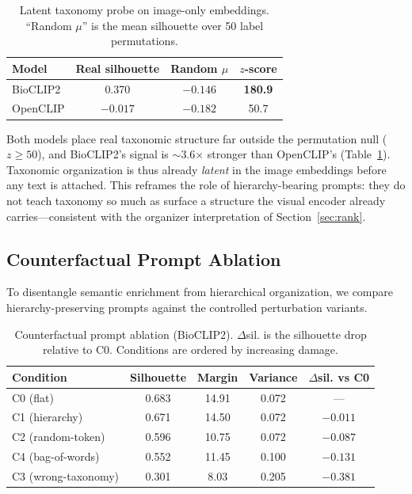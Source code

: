\begin{table}[t]
\centering
\caption{Latent taxonomy probe on image-only embeddings. ``Random $\mu$'' is the
mean silhouette over 50 label permutations.}
\label{tab:latent}
\begin{tabular}{lccc}
\hline
Model & Real silhouette & Random $\mu$ & $z$-score \\
\hline
BioCLIP2 & 0.370 & $-0.146$ & \textbf{180.9} \\
OpenCLIP & $-0.017$ & $-0.182$ & 50.7 \\
\hline
\end{tabular}
\end{table}

Both models place real taxonomic structure far outside the permutation null
($z \ge 50$), and BioCLIP2's signal is $\sim$3.6$\times$ stronger than OpenCLIP's
(Table~\ref{tab:latent}). Taxonomic organization is thus already \emph{latent} in
the image embeddings before any text is attached. This reframes the role of
hierarchy-bearing prompts: they do not teach taxonomy so much as surface a structure
the visual encoder already carries---consistent with the organizer interpretation of
Section~\ref{sec:rank}.

\subsection{Counterfactual Prompt Ablation}
\label{sec:ablation}

To disentangle semantic enrichment from hierarchical organization, we compare
hierarchy-preserving prompts against the controlled perturbation variants.

\begin{table}[t]
\centering
\caption{Counterfactual prompt ablation (BioCLIP2). $\Delta$sil. is the silhouette
drop relative to C0. Conditions are ordered by increasing damage.}
\label{tab:ablation}
\begin{tabular}{lcccc}
\hline
Condition & Silhouette & Margin & Variance & $\Delta$sil. vs C0 \\
\hline
C0 (flat)            & 0.683 & 14.91 & 0.072 & --- \\
C1 (hierarchy)       & 0.671 & 14.50 & 0.072 & $-0.011$ \\
C2 (random-token)    & 0.596 & 10.75 & 0.072 & $-0.087$ \\
C4 (bag-of-words)    & 0.552 & 11.45 & 0.100 & $-0.131$ \\
C3 (wrong-taxonomy)  & 0.301 & 8.03  & 0.205 & $-0.381$ \\
\hline
\end{tabular}
\end{table}

